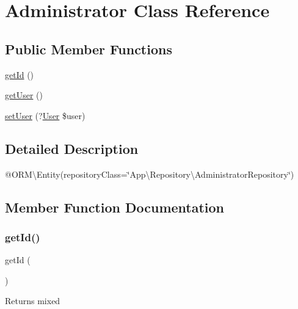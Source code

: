 \hypertarget{class_app_1_1_entity_1_1_administrator}{}\section{Administrator Class Reference}
\label{class_app_1_1_entity_1_1_administrator}
\subsection*{Public Member Functions}
\begin{DoxyCompactItemize}
\item 
\mbox{\hyperlink{class_app_1_1_entity_1_1_administrator_a12251d0c022e9e21c137a105ff683f13}{get\+Id}} ()
\item 
\mbox{\hyperlink{class_app_1_1_entity_1_1_administrator_ae81b7186fb97a7c6457edcc68c9aa2ef}{get\+User}} ()
\item 
\mbox{\hyperlink{class_app_1_1_entity_1_1_administrator_a406a111868b45aad6d4c8ab5b0c5bcb9}{set\+User}} (?\mbox{\hyperlink{class_app_1_1_entity_1_1_user}{User}} \$user)
\end{DoxyCompactItemize}


\subsection{Detailed Description}
@\+O\+RM\textbackslash{}\+Entity(repository\+Class=\char`\"{}\+App\textbackslash{}\+Repository\textbackslash{}\+Administrator\+Repository\char`\"{}) 

\subsection{Member Function Documentation}
\mbox{\label{class_app_1_1_entity_1_1_administrator_a12251d0c022e9e21c137a105ff683f13}} 
\subsubsection{\texorpdfstring{getId()}{getId()}}
{\footnotesize\ttfamily get\+Id (\begin{DoxyParamCaption}{ }\end{DoxyParamCaption})}

\begin{DoxyReturn}{Returns}
mixed 
\end{DoxyReturn}
\mbox{\label{class_app_1_1_entity_1_1_administrator_ae81b7186fb97a7c6457edcc68c9aa2ef}} 

